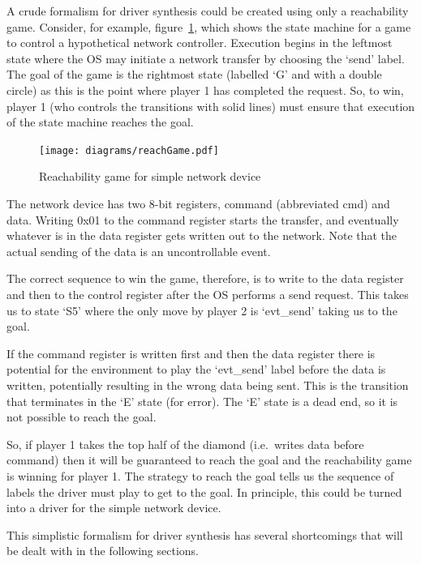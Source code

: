 A crude formalism for driver synthesis could be created using only a reachability game. Consider, for example, figure~\ref{fig:reach}, which shows the state machine for a game to control a hypothetical network controller. Execution begins in the leftmost state where the OS may initiate a network transfer by choosing the `send' label. The goal of the game is the rightmost state (labelled `G' and with a double circle) as this is the point where player 1 has completed the request. So, to win, player 1 (who controls the transitions with solid lines) must ensure that execution of the state machine reaches the goal. 

\begin{figure}
\centering
\texttt{[image: diagrams/reachGame.pdf]}
\caption{Reachability game for simple network device}
\label{fig:reach}
\end{figure}

The network device has two 8-bit registers, command (abbreviated cmd) and data. Writing 0x01 to the command register starts the transfer, and eventually whatever is in the data register gets written out to the network. Note that the actual sending of the data is an uncontrollable event. 

The correct sequence to win the game, therefore, is to write to the data register and then to the control register after the OS performs a send request. This takes us to state `S5' where the only move by player 2 is `evt\_send' taking us to the goal. 

If the command register is written first and then the data register there is potential for the environment to play the `evt\_send' label before the data is written, potentially resulting in the wrong data being sent. This is the transition that terminates in the `E' state (for error). The `E' state is a dead end, so it is not possible to reach the goal. 

So, if player 1 takes the top half of the diamond (i.e.\ writes data before command) then it will be guaranteed to reach the goal and the reachability game is winning for player 1. The strategy to reach the goal tells us the sequence of labels the driver must play to get to the goal. In principle, this could be turned into a driver for the simple network device.

This simplistic formalism for driver synthesis has several shortcomings that will be dealt with in the following sections.

\subsection{\buchi}

